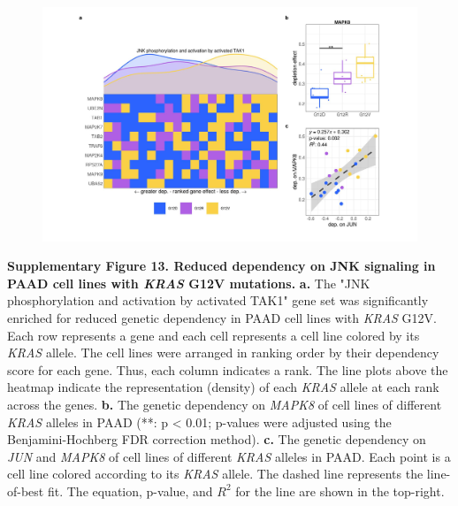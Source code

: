 \documentclass[english, 10pt, letterpaper]{article}
\newcommand{\KRAS}{\emph{KRAS}}
\begin{document}
\begin{figure}[h!]
\centering
\includegraphics[width=180mm]{figures/Supp_Fig_13.jpeg}
\label{sfig:paad-dependency-JUN}
\end{figure}

\noindent \textbf{Supplementary Figure 13. Reduced dependency on JNK signaling in PAAD cell lines with \KRAS{} G12V mutations.}
\textbf{a.} The "JNK phosphorylation and activation by activated TAK1" gene set was significantly enriched for reduced genetic dependency in PAAD cell lines with \KRAS{} G12V. Each row represents a gene and each cell represents a cell line colored by its \KRAS{} allele. The cell lines were arranged in ranking order by their dependency score for each gene. Thus, each column indicates a rank. The line plots above the heatmap indicate the representation (density) of each \KRAS{} allele at each rank across the genes.
\textbf{b.} The genetic dependency on \emph{MAPK8} of cell lines of different \KRAS{} alleles in PAAD (**: p < 0.01; p-values were adjusted using the Benjamini-Hochberg FDR correction method).
\textbf{c.} The genetic dependency on \emph{JUN} and \emph{MAPK8} of cell lines of different \KRAS{} alleles in PAAD. Each point is a cell line colored according to its \KRAS{} allele. The dashed line represents the line-of-best fit. The equation, p-value, and $R^2$ for the line are shown in the top-right.
\newpage
\end{document}

